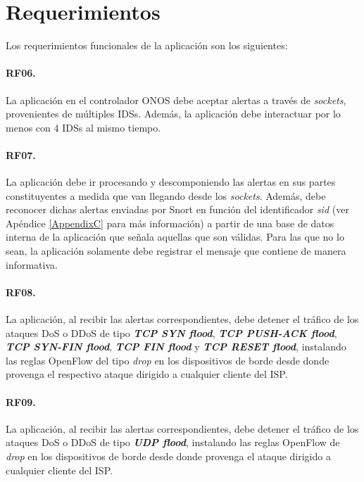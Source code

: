 \section{Requerimientos} \label{sec:reqs_app_2}

Los requerimientos funcionales de la aplicación son los siguientes:

\paragraph{RF06.} La aplicación en el controlador ONOS debe aceptar alertas a
través de \textit{sockets}, provenientes de múltiples IDSs. Además, la
aplicación debe interactuar por lo menos con 4 IDSs al mismo tiempo.

\paragraph{RF07.} La aplicación debe ir procesando y descomponiendo las alertas
en sus partes constituyentes a medida que van llegando desde los
\textit{sockets}. Además, debe reconocer dichas alertas enviadas por Snort en
función del identificador \textit{sid} (ver Apéndice \ref{AppendixC} para
más información) a partir de una base de datos interna de la aplicación que
señala aquellas que son válidas. Para las que no lo sean, la aplicación
solamente debe registrar el mensaje que contiene de manera informativa.

\paragraph{RF08.} La aplicación, al recibir las alertas correspondientes, debe
detener el tráfico de los ataques DoS o DDoS de tipo \textit{\textbf{TCP SYN
    flood}}, \textit{\textbf{TCP PUSH-ACK flood}},\textit{ \textbf{TCP SYN-FIN
    flood}}, \textit{\textbf{TCP FIN flood}} y \textit{\textbf{TCP RESET
    flood}}, instalando las reglas OpenFlow del tipo \textit{drop} en los
dispositivos de borde desde donde provenga el respectivo ataque dirigido a
cualquier cliente del ISP.

\paragraph{RF09.} La aplicación, al recibir las alertas correspondientes, debe
detener el tráfico de los ataques DoS o DDoS de tipo \textit{\textbf{UDP
    flood}}, instalando las reglas OpenFlow de \textit{drop} en los dispositivos
de borde desde donde provenga el ataque dirigido a cualquier cliente del ISP.

